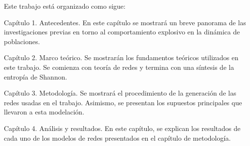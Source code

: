 \documentclass[../main.tex]{subfiles}
\begin{document}
Este trabajo está organizado como sigue: 

Capítulo 1. Antecedentes. En este capítulo se mostrará un breve panorama de las investigaciones previas en torno al comportamiento explosivo en la dinámica de poblaciones. 

Capítulo 2. Marco teórico.  Se mostrarán los fundamentos teóricos utilizados en este trabajo. Se comienza con teoría de redes y termina con una síntesis de la entropía de Shannon. 

Capítulo 3. Metodología. Se mostrará el procedimiento de la generación de  las redes usadas en el trabajo. Asimismo, se presentan los supuestos principales que llevaron a esta modelación.

Capítulo 4. Análisis y resultados. En este capítulo, se explican los resultados de cada uno de los modelos de redes presentados en el capítulo de metodología.






\end{document}
